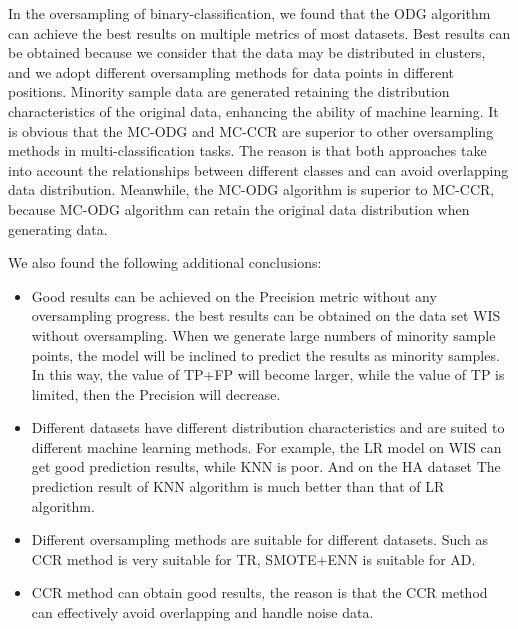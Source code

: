\documentclass[runningheads]{llncs}
\begin{document}
In the oversampling of binary-classification, 
we found that the ODG algorithm can achieve the best results on multiple metrics of most datasets.
Best results can be obtained because we consider that the data may be distributed in clusters, 
and we adopt different oversampling methods for data points in different positions.
Minority sample data are generated retaining the distribution characteristics of the original data, 
enhancing the ability of machine learning.
It is obvious that the MC-ODG and MC-CCR are superior to other oversampling methods in  
multi-classification tasks. 
The reason is that both approaches take into account the relationships between different classes and
can avoid overlapping data distribution.
Meanwhile, the MC-ODG algorithm is superior to MC-CCR, because MC-ODG
algorithm can retain the original data distribution when generating data.

We also found the following additional conclusions:
\begin{itemize}
  \item Good results can be achieved on the Precision metric without any oversampling progress. 
   the best results can be obtained on the data set WIS without oversampling.
   When we generate large numbers of minority sample points, 
   the model will be inclined to predict the results as minority samples. In this way, 
   the value of TP+FP will become larger, while the value of TP is limited, then the Precision will decrease.
  \item Different datasets have different distribution characteristics
   and are suited to different machine learning methods.
  For example, the LR model on WIS can get good prediction results, while KNN is poor. 
  And on the HA dataset
  The prediction result of KNN algorithm is much better than that of LR algorithm.
  \item Different oversampling methods are suitable for different datasets. 
  Such as CCR method is very suitable for TR, 
  SMOTE+ENN is suitable for AD.
  \item CCR method can obtain good results, 
  the reason is that the CCR method can effectively avoid overlapping and handle noise data.
\end{itemize}
\end{document}
